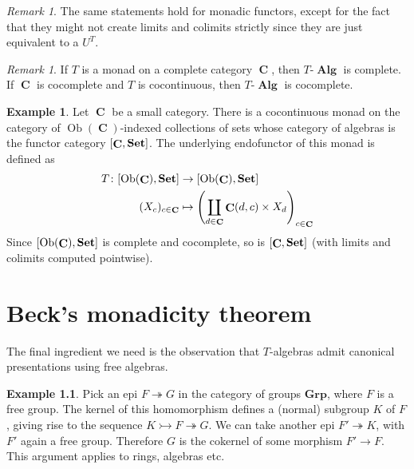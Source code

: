 \documentclass[a4paper,11pt,twoside, openany]{book}
\newcommand{\catname}[1]{{\normalfont\textbf{#1}}}
\DeclareMathOperator{\Alg}{\mathbf{Alg}}
\newcommand{\Set}{\catname{Set}}
\DeclareMathOperator{\C}{\mathbf{C}}
\DeclareMathOperator{\Ob}{Ob}
\theoremstyle{definition}
\theoremstyle{definition}
\newtheorem{exmp}[thm]{Example} %
\theoremstyle{remark}
\newtheorem{rmk}[thm]{Remark}
\begin{document}
	\begin{rmk}
		The same statements hold for monadic functors, except for the fact that they might not create limits and colimits strictly since they are just equivalent to a $U^T$.
	\end{rmk}
	
	\begin{rmk}
		If $T$ is a monad on a complete category $\C$, then $T\mbox{-}\Alg$ is complete. If $\C$ is cocomplete and $T$ is cocontinuous, then $T\mbox{-}\Alg$ is cocomplete.
	\end{rmk}
	
	\begin{exmp}
		Let $\C$ be a small category. There is a cocontinuous monad on the category of $\Ob(\C)$-indexed collections of sets whose category of algebras is the functor category $[\C,\Set]$. The underlying endofunctor of this monad is defined as 
		\begin{align*}
		T\colon[\Ob(\C),\Set]&\to[\Ob(\C),\Set] \\
		(X_c)_{c\in\C}&\mapsto \left(\coprod_{d\in\C}\C(d,c)\times X_d\right)_{c\in\C}
		\end{align*}
		Since $[\Ob(\C),\Set]$ is complete and cocomplete, so is $[\C,\Set]$ (with limits and colimits computed pointwise).
	\end{exmp}
	
	\chapter{Beck’s monadicity theorem}
	The final ingredient we need is the observation that $T$-algebras admit canonical presentations using free algebras.
	
	\begin{exmp}
		Pick an epi $F\twoheadrightarrow G$ in the category of groups $\mathbf{Grp}$, where $F$ is a free group. The kernel of this homomorphism defines a (normal) subgroup $K$ of $F$, giving rise to the sequence $K\rightarrowtail F\twoheadrightarrow G$. We can take another epi $F'\twoheadrightarrow K$, with $F'$ again a free group. Therefore $G$ is the cokernel of some morphism $F'\to F$. This argument applies to rings, algebras etc.
	\end{exmp}
	
\end{document}
